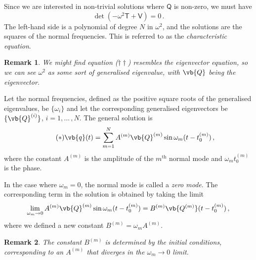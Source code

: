 \documentclass{article}
\theoremstyle{plain}\theoremheaderfont{\normalfont\itshape}\theorembodyfont{\rmfamily}\theoremseparator{.}\newtheorem*{rem}{Remark}\newtheorem*{ex}{Example}\newtheorem*{proof}{Proof}\newtheorem*{altp}{Alternative proof}
\theoremstyle{plain}\theoremheaderfont{\normalfont\bfseries}\theorembodyfont{\rmfamily}\theoremseparator{.}\newtheorem{thm}{Theorem}[section]\newtheorem{lem}[thm]{Lemma}\newtheorem{prop}[thm]{Proposition}\newtheorem*{cor}{Corollary}\newtheorem{defn}[thm]{Definition}\newtheorem{clm}[thm]{Claim}\newtheorem{clminproof}{Claim}
\theoremstyle{break}\theoremheaderfont{\normalfont\itshape}\theorembodyfont{\rmfamily}\theoremseparator{.\medskip}\newtheorem*{proofskip}{Proof}\newtheorem*{exs}{Examples}\newtheorem*{rems}{Remarks}
\theoremstyle{break}\theoremheaderfont{\normalfont\bfseries}\theorembodyfont{\rmfamily}\theoremseparator{.\medskip}\newtheorem{lemskip}[thm]{Lemma}\newtheorem{defnskip}[thm]{Definition}\newtheorem{propskip}[thm]{Proposition}\newtheorem{thmskip}[thm]{Theorem}
\numberwithin{equation}{section}
\begin{document}
	Since we are interested in non-trivial solutions where \(\mathsf{Q}\) is non-zero, we must have
	\[\det(-\omega^2\mathsf{T}+\mathsf{V})=0\,.\]
	The left-hand side is a polynomial of degree \(N\) in \(\omega^2\), and the solutions are the squares of the normal frequencies. This is referred to as the \textit{characteristic equation}.

	\begin{rem}
		We might find equation (\(\dagger\dagger\)) resembles the eigenvector equation, so we can see \(\omega^2\) as some sort of generalised eigenvalue, with \(\vb{Q}\) being the eigenvector.
	\end{rem}
	
	Let the normal frequencies, defined as the positive square roots of the generalised eigenvalues, be \(\{\omega_i\}\) and let the corresponding generalised eigenvectors be \(\{\vb{Q}^{(i)}\}\), \(i=1,\dots\,,N\). The general solution is
	\begin{equation}\tag{\(*\)}
		\vb{q}(t)=\sum_{m=1}^{N}A^{(m)}\vb{Q}^{(m)}\sin\omega_m(t-t_0^{(m)})\,,
	\end{equation}
	where the constant \(A^{(m)}\) is the amplitude of the \(m^{\text{th}}\) normal mode and \(\omega_mt_0^{(m)}\) is the phase.

	In the case where \(\omega_m=0\), the normal mode is called a \textit{zero mode}. The corresponding term in the solution is obtained by taking the limit
	\[\lim_{\omega_m\to 0}A^{(m)}\vb{Q}^{(m)}\sin\omega_m(t-t_0^{(m)})=B^{(m)}\vb{Q^{(m)}}(t-t_0^{(m)})\,,\]
	where we defined a new constant \(B^{(m)}=\omega_m A^{(m)}\).
	\begin{rem}
		The constant \(B^{(m)}\) is determined by the initial conditions, corresponding to an \(A^{(m)}\) that diverges in the \(\omega_m\to 0\) limit.
	\end{rem}
\end{document}
